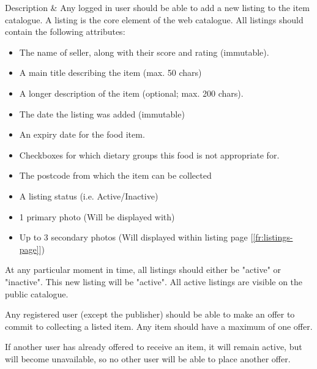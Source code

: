 \documentclass[12pt]{article}
\begin{document}
\begin{reqtable}
    Description        &
    Any logged in user should be able to add a new listing to the item catalogue.
                        A listing is the core element of the web catalogue.
                        All listings should contain the following attributes:
                        \begin{itemize}
                            \itemsep-1em
                            \item The name of seller, along with their score
                                and rating (immutable).
                            \item A main title describing the item (max. 50 chars)
                            \item A longer description of the item
                                (optional; max. 200 chars).
                            \item The date the listing was added (immutable)
                            \item An expiry date for the food item.
                            \item Checkboxes for which dietary groups this food is not appropriate for.
                            \item The postcode from which the item can be collected
                            \item A listing status (i.e. Active/Inactive)
                            \item 1 primary photo
                                (Will be displayed with)
                            \item Up to 3 secondary photos
                                (Will displayed within listing page [\autoref{fr:listings-page}])
                        \end{itemize}
                        At any particular moment in time, all listings should either be "active" or "inactive". This new listing will be "active".
                        All active listings are visible on the public catalogue.

                        Any registered user (except the publisher) should be
                        able to make an offer to commit to collecting a listed
                        item. Any item should have a maximum of one offer.

                        If another user has already offered to receive an item,
                        it will remain active, but will become unavailable, so
                        no other user will be able to place another offer.
                        

\end{reqtable}
\end{document}
